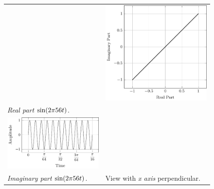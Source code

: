 \documentclass[../../course]{subfiles}
\begin{document}
\begin{figure} [H]
\begin{NiceTabularX} {\textwidth} {
            *{2}{>{\centering\arraybackslash}X}
        }
        &

         {
             {
                \includegraphics[height = \textheight] {tikzpics/plotFrontViewComplexI.pdf}
            }
        }

        \\

         {\emph{Real part} $\sin(2 \pi 56 t)$.}
        \label{plt:realCmplxI}

        &
        \\

         {
             {
                \includegraphics[height = \textheight] {tikzpics/plotShortX3.pdf}
            }
        }

        &
        \\

         {\emph{Imaginary part} $\sin(2 \pi 56 t)$.}
        \label{plt:imagCmplxI}

        &

         {View with \emph{x axis} perpendicular.}
        \label{plt:frontViewCmplxI}

        \\

    \end{NiceTabularX}

\end{figure}
\end{document}
